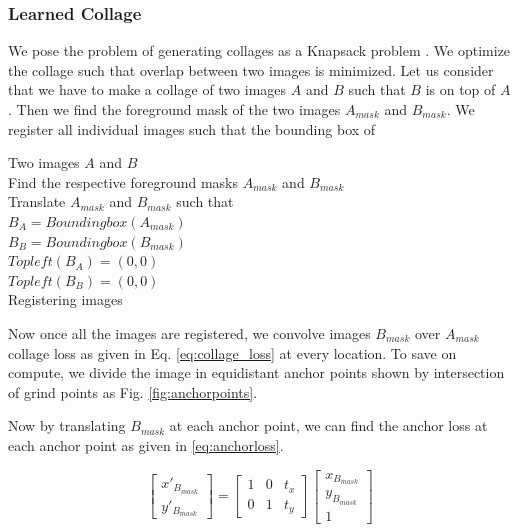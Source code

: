\documentclass{article}
\begin{document}
\subsubsection{Learned Collage}
\label{sec:GeneratingCollage}
We pose the problem of generating collages as a Knapsack problem \cite{KnapsackProblem}. We optimize the collage such that overlap between two images is minimized. Let us consider that we have to make a collage of two images $A$ and $B$ such that $B$ is on top of $A$. Then we find the foreground mask of the two images $A_{mask}$ and $B_{mask}$. We register all individual images such that the bounding box of 

\begin{algorithm}[H]
\SetAlgoLined
Two images $A$ and $B$ \\
Find the respective foreground masks $A_{mask}$ and $B_{mask}$\\
Translate $A_{mask}$ and $B_{mask}$ such that\\
$B_{A} =  Boundingbox(A_{mask})$\\
$B_{B} =  Boundingbox(B_{mask})$\\
$Topleft(B_{A}) = (0,0) $\\
$Topleft(B_{B}) = (0,0) $\\
 \caption{Registering images}
\end{algorithm}

Now once all the images are registered, we convolve images $B_{mask}$ over  $A_{mask}$ collage loss as given in Eq. \eqref{eq:collage_loss} at every location. To save on compute, we divide the image in equidistant anchor points shown by intersection of grind points as Fig. \ref{fig:anchorpoints}. 


Now by translating $B_{mask}$ at each anchor point, we can find the anchor loss at each anchor point as given in \ref{eq:anchorloss}.

\begin{equation}
\begin{bmatrix}
x'_{B_{mask}}\\
y'_{B_{mask}}
\end{bmatrix}
= 
\begin{bmatrix}
1 & 0 & t_{x}\\
0 & 1 & t_{y}
\end{bmatrix}
\begin{bmatrix}
x_{B_{mask}}\\
y_{B_{mask}}\\
1
\end{bmatrix}
\end{equation}
\end{document}
